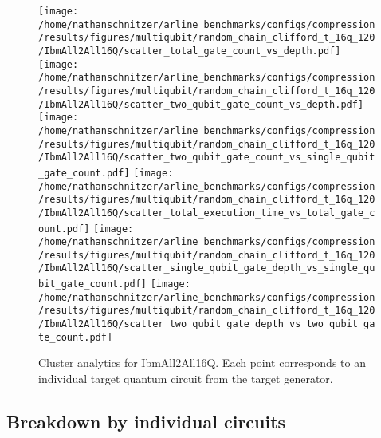 \documentclass{report}%
\begin{document}
\begin{figure}[h!]%
\centering%
\texttt{[image: /home/nathanschnitzer/arline\_benchmarks/configs/compression/results/figures/multiqubit/random\_chain\_clifford\_t\_16q\_120/IbmAll2All16Q/scatter\_total\_gate\_count\_vs\_depth.pdf]}%
\centering%
\texttt{[image: /home/nathanschnitzer/arline\_benchmarks/configs/compression/results/figures/multiqubit/random\_chain\_clifford\_t\_16q\_120/IbmAll2All16Q/scatter\_two\_qubit\_gate\_count\_vs\_depth.pdf]}%
\linebreak%
\centering%
\texttt{[image: /home/nathanschnitzer/arline\_benchmarks/configs/compression/results/figures/multiqubit/random\_chain\_clifford\_t\_16q\_120/IbmAll2All16Q/scatter\_two\_qubit\_gate\_count\_vs\_single\_qubit\_gate\_count.pdf]}%
\centering%
\texttt{[image: /home/nathanschnitzer/arline\_benchmarks/configs/compression/results/figures/multiqubit/random\_chain\_clifford\_t\_16q\_120/IbmAll2All16Q/scatter\_total\_execution\_time\_vs\_total\_gate\_count.pdf]}%
\linebreak%
\centering%
\texttt{[image: /home/nathanschnitzer/arline\_benchmarks/configs/compression/results/figures/multiqubit/random\_chain\_clifford\_t\_16q\_120/IbmAll2All16Q/scatter\_single\_qubit\_gate\_depth\_vs\_single\_qubit\_gate\_count.pdf]}%
\centering%
\texttt{[image: /home/nathanschnitzer/arline\_benchmarks/configs/compression/results/figures/multiqubit/random\_chain\_clifford\_t\_16q\_120/IbmAll2All16Q/scatter\_two\_qubit\_gate\_depth\_vs\_two\_qubit\_gate\_count.pdf]}%
\linebreak%
\caption{Cluster analytics for IbmAll2All16Q. Each point corresponds to an individual target
                    quantum circuit from the target generator.}%
\end{figure}

%
\clearpage%
\subsection*{Breakdown by individual circuits }%
\label{subsec:Breakdownbyindividualcircuits}%

%
\end{document}
